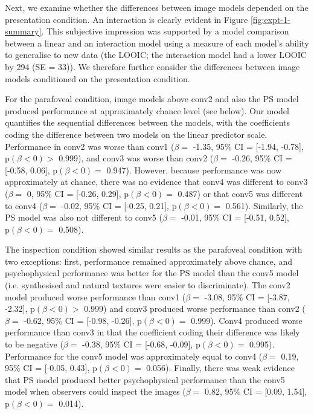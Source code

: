 \documentclass[article, 11pt,a4paper,natbib]{apa6}\usepackage[]{graphicx}\usepackage[]{color}
\begin{document}
Next, we examine whether the differences between image models depended on the presentation condition.
An interaction is clearly evident in Figure \ref{fig:expt-1-summary}.
This subjective impression was supported by a model comparison between a linear and an interaction model using a measure of each model's ability to generalise to new data (the LOOIC; the interaction model had a lower LOOIC by
294 (SE = 33)).
We therefore further consider the differences between image models conditioned on the presentation condition.

For the parafoveal condition, image models above conv2 and also the PS model produced performance at approximately chance level (see below).
Our model quantifies the sequential differences between the models, with the coefficients coding the difference between two models on the linear predictor scale.
Performance in conv2 was worse than conv1
($\beta = $ -1.35, 95\% CI = [-1.94, -0.78], $\mathrm{p}(\beta < 0) > $ 0.999),
and conv3 was worse than conv2
($\beta = $ -0.26, 95\% CI = [-0.58, 0.06], $\mathrm{p}(\beta < 0) = $ 0.947).
However, because performance was now approximately at chance, there was no evidence that conv4 was different to conv3
($\beta = $ 0, 95\% CI = [-0.26, 0.29], $\mathrm{p}(\beta < 0) = $ 0.487)
or that conv5 was different to conv4
($\beta = $ -0.02, 95\% CI = [-0.25, 0.21], $\mathrm{p}(\beta < 0) = $ 0.561).
Similarly, the PS model was also not different to conv5
($\beta = $ -0.01, 95\% CI = [-0.51, 0.52], $\mathrm{p}(\beta < 0) = $ 0.508).

The inspection condition showed similar results as the parafoveal condition with two exceptions: first, performance remained approximately above chance, and psychophysical performance was better for the PS model than the conv5 model (i.e. synthesised and natural textures were easier to discriminate).
The conv2 model produced worse performance than conv1
($\beta = $ -3.08, 95\% CI = [-3.87, -2.32], $\mathrm{p}(\beta < 0) > $ 0.999) and
conv3 produced worse performance than conv2
($\beta = $ -0.62, 95\% CI = [-0.98, -0.26], $\mathrm{p}(\beta < 0) = $ 0.999).
Conv4 produced worse performance than conv3 in that the coefficient coding their difference was likely to be negative
($\beta = $ -0.38, 95\% CI = [-0.68, -0.09], $\mathrm{p}(\beta < 0) = $ 0.995).
Performance for the conv5 model was approximately equal to conv4
($\beta = $ 0.19, 95\% CI = [-0.05, 0.43], $\mathrm{p}(\beta < 0) = $ 0.056).
Finally, there was weak evidence that PS model produced better psychophysical performance than the conv5 model when observers could inspect the images
($\beta = $ 0.82, 95\% CI = [0.09, 1.54], $\mathrm{p}(\beta < 0) = $ 0.014).
\end{document}
